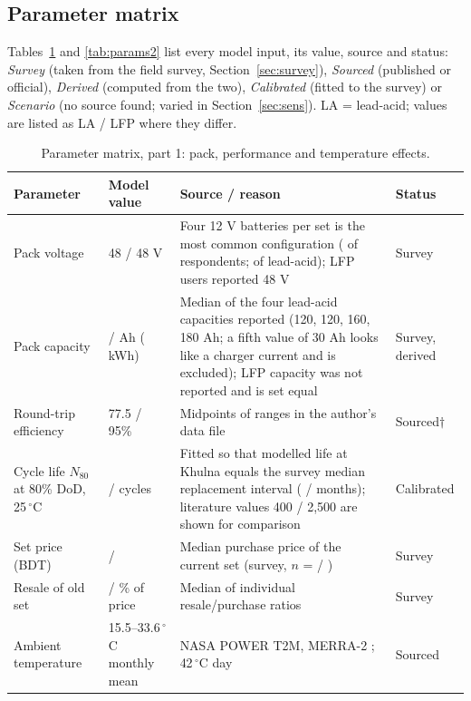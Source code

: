 \subsection{Parameter matrix}
Tables~\ref{tab:params1} and \ref{tab:params2} list every model input, its value, source and status: \emph{Survey} (taken from the field survey, Section~\ref{sec:survey}), \emph{Sourced} (published or official), \emph{Derived} (computed from the two), \emph{Calibrated} (fitted to the survey) or \emph{Scenario} (no source found; varied in Section~\ref{sec:sens}). LA = lead-acid; values are listed as LA / LFP where they differ.
\begin{table}[t]
\caption{Parameter matrix, part 1: pack, performance and temperature effects.}
\label{tab:params1}
\centering\footnotesize
\renewcommand{\arraystretch}{1.1}
\begin{tabular}{p{2.5cm}p{3.3cm}p{6.8cm}p{1.8cm}}
\hline
Parameter & Model value & Source / reason & Status \\
\hline
Pack voltage & 48 / 48 V & Four 12 V batteries per set is the most common configuration (\fourBat{} of \nSurvey{} respondents; \fourBatLA{} of \nLA{} lead-acid); LFP users reported 48 V & Survey \\
Pack capacity & \ahMed{} / \ahMed{} Ah (\packKWh{} kWh) & Median of the four lead-acid capacities reported (120, 120, 160, 180 Ah; a fifth value of 30 Ah looks like a charger current and is excluded); LFP capacity was not reported and is set equal & Survey, derived \\
Round-trip efficiency & 77.5 / 95\% & Midpoints of ranges in the author's data file \cite{keshan2016} & Sourced$\dagger$ \\
Cycle life $N_{80}$ at 80\% DoD, 25\,$^\circ$C & \NcalLA{} / \NcalLFP{} cycles & Fitted so that modelled life at Khulna equals the survey median replacement interval (\replMedLA{} / \replMedLFP{} months); literature values 400 / 2{,}500 \cite{keshan2016} are shown for comparison & Calibrated \\
Set price (BDT) & \priceLA{} / \priceLFP{} & Median purchase price of the current set (survey, $n$ = \nLA{} / \nLFP{}) & Survey \\
Resale of old set & \scrapLA{} / \scrapLFP{}\% of price & Median of individual resale/purchase ratios & Survey \\
Ambient temperature & 15.5--33.6\,$^\circ$C monthly mean & NASA POWER T2M, MERRA-2 \cite{nasa_power,gelaro2017}; 42\,$^\circ$C day \cite{heat2025} & Sourced \\

\end{tabular}
\end{table}
